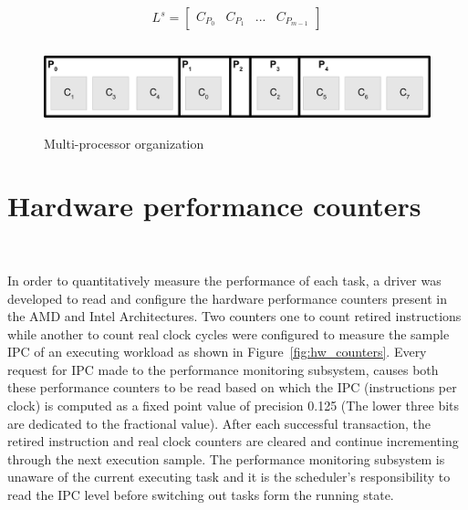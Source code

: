 \begin{equation}
   L^{s} = \left[
     \begin{array}{lccr}
       C_{P_{0}} & C_{P_{1}} & ... & C_{P_{m-1}}
     \end{array} \right]
     \label{eq:layout_scheduler}
\end{equation}


\begin{figure}[h!]
  \begin{center}
    \includegraphics[height=1in]{figures/Processor_Organization.jpg}
    \caption{Multi-processor organization}
    \label{fig:processor_groups}
  \end{center}
\end{figure}



\section{Hardware performance counters}~\label{sec:perf_counters}

In order to quantitatively measure the performance of each task, 
a driver was developed to read and configure the hardware performance counters
present in the AMD and Intel Architectures. Two counters one to count retired instructions
while another to count real clock cycles were configured to measure the sample IPC 
of an executing workload as shown in Figure~\ref{fig:hw_counters}. Every
request for IPC made to the performance monitoring subsystem,
causes both these performance counters to be read based on which the IPC (instructions per clock) is computed 
as a fixed point value of precision 0.125 (The lower three bits are dedicated to the fractional value).
After each successful transaction, the retired instruction and real clock counters are cleared and 
continue incrementing through the next execution sample.
The performance monitoring subsystem is unaware of the current executing task and it is the scheduler's
responsibility to read the IPC level before switching out tasks form the running state. 

